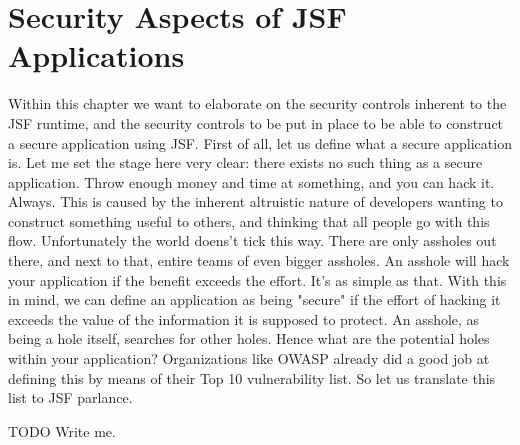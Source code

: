 %

\chapter{Security Aspects of JSF Applications}
Within this chapter we want to elaborate on the security controls inherent to the JSF runtime, and the security controls to be put in place to be able to construct a secure application using JSF.
First of all, let us define what a secure application is.
Let me set the stage here very clear: there exists no such thing as a secure application.
Throw enough money and time at something, and you can hack it.
Always.
This is caused by the inherent altruistic nature of developers wanting to construct something useful to others, and thinking that all people go with this flow.
Unfortunately the world doens't tick this way.
There are only assholes out there, and next to that, entire teams of even bigger assholes.
An asshole will hack your application if the benefit exceeds the effort.
It's as simple as that.
With this in mind, we can define an application as being "secure" if the effort of hacking it exceeds the value of the information it is supposed to protect.
An asshole, as being a hole itself, searches for other holes.
Hence what are the potential holes within your application?
Organizations like OWASP already did a good job at defining this by means of their Top 10 vulnerability list.
So let us translate this list to JSF parlance.

\begin{TODO}{TODO}
	Write me.
\end{TODO}



